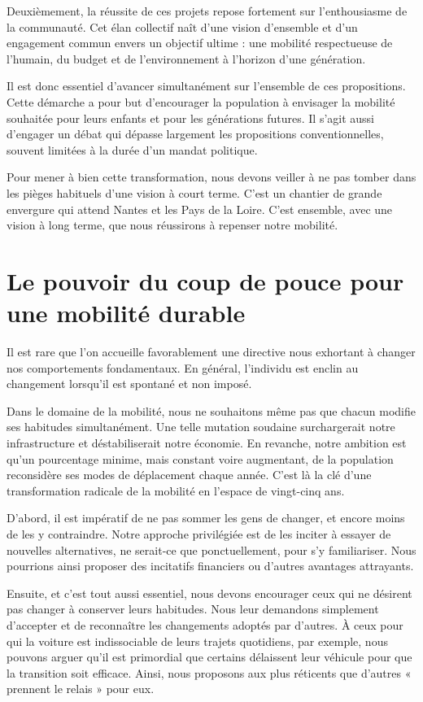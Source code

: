 Deuxièmement, la réussite de ces projets repose fortement sur
l'enthousiasme de la communauté. Cet élan collectif naît d'une vision
d'ensemble et d'un engagement commun envers un objectif ultime : une
mobilité respectueuse de l’humain, du budget et de l’environnement à
l’horizon d’une génération.

Il est donc essentiel d’avancer simultanément sur l'ensemble de ces
propositions. Cette démarche a pour but d’encourager la population à
envisager la mobilité souhaitée pour leurs enfants et pour les
générations futures. Il s’agit aussi d’engager un débat qui dépasse
largement les propositions conventionnelles, souvent limitées à la
durée d’un mandat politique.

Pour mener à bien cette transformation, nous devons veiller à ne pas
tomber dans les pièges habituels d’une vision à court terme. C’est un
chantier de grande envergure qui attend Nantes et les Pays de la
Loire. C’est ensemble, avec une vision à long terme, que nous
réussirons à repenser notre mobilité.


\section{Le pouvoir du coup de pouce pour une mobilité durable}

Il est rare que l’on accueille favorablement une directive nous
exhortant à changer nos comportements fondamentaux. En général,
l'individu est enclin au changement lorsqu'il est spontané et non
imposé.

Dans le domaine de la mobilité, nous ne souhaitons même pas que chacun
modifie ses habitudes simultanément. Une telle mutation soudaine
surchargerait notre infrastructure et déstabiliserait notre
économie. En revanche, notre ambition est qu'un pourcentage minime,
mais constant voire augmentant, de la population reconsidère ses modes
de déplacement chaque année. C'est là la clé d'une transformation
radicale de la mobilité en l'espace de vingt-cinq ans.

D'abord, il est impératif de ne pas sommer les gens de changer, et
encore moins de les y contraindre. Notre approche privilégiée est de
les inciter à essayer de nouvelles alternatives, ne serait-ce que
ponctuellement, pour s’y familiariser. Nous pourrions ainsi proposer
des incitatifs financiers ou d'autres avantages attrayants.

Ensuite, et c'est tout aussi essentiel, nous devons encourager ceux
qui ne désirent pas changer à conserver leurs habitudes. Nous leur
demandons simplement d'accepter et de reconnaître les changements
adoptés par d'autres. À ceux pour qui la voiture est indissociable de
leurs trajets quotidiens, par exemple, nous pouvons arguer qu’il est
primordial que certains délaissent leur véhicule pour que la
transition soit efficace. Ainsi, nous proposons aux plus réticents que
d'autres « prennent le relais » pour eux.

